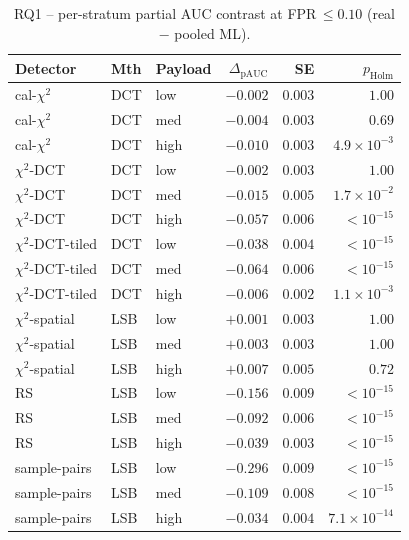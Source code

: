 \documentclass[10pt,twocolumn,a4paper]{article}
\begin{document}
\begin{table}[h]
\centering\footnotesize
\caption{RQ1 -- per-stratum partial AUC contrast at FPR\,$\leq\!0.10$ (real $-$ pooled ML).}
\label{tab:appendix-pauc}
\setlength{\tabcolsep}{4pt}\renewcommand{\arraystretch}{1.1}
\begin{tabular}{@{}l l l r r r@{}}
\toprule
\textbf{Detector} & \textbf{Mth} & \textbf{Payload} & \textbf{$\Delta_\text{pAUC}$} & \textbf{SE} & \textbf{$p_\text{Holm}$} \\
\midrule
cal-$\chi^2$         & DCT & low    & $-0.002$ & $0.003$ & $1.00$ \\
cal-$\chi^2$         & DCT & med    & $-0.004$ & $0.003$ & $0.69$ \\
cal-$\chi^2$         & DCT & high   & $-0.010$ & $0.003$ & $4.9\!\times\!10^{-3}$ \\
$\chi^2$-DCT         & DCT & low    & $-0.002$ & $0.003$ & $1.00$ \\
$\chi^2$-DCT         & DCT & med    & $-0.015$ & $0.005$ & $1.7\!\times\!10^{-2}$ \\
$\chi^2$-DCT         & DCT & high   & $-0.057$ & $0.006$ & $<\!10^{-15}$ \\
$\chi^2$-DCT-tiled   & DCT & low    & $-0.038$ & $0.004$ & $<\!10^{-15}$ \\
$\chi^2$-DCT-tiled   & DCT & med    & $-0.064$ & $0.006$ & $<\!10^{-15}$ \\
$\chi^2$-DCT-tiled   & DCT & high   & $-0.006$ & $0.002$ & $1.1\!\times\!10^{-3}$ \\
$\chi^2$-spatial     & LSB & low    & $+0.001$ & $0.003$ & $1.00$ \\
$\chi^2$-spatial     & LSB & med    & $+0.003$ & $0.003$ & $1.00$ \\
$\chi^2$-spatial     & LSB & high   & $+0.007$ & $0.005$ & $0.72$ \\
RS                   & LSB & low    & $-0.156$ & $0.009$ & $<\!10^{-15}$ \\
RS                   & LSB & med    & $-0.092$ & $0.006$ & $<\!10^{-15}$ \\
RS                   & LSB & high   & $-0.039$ & $0.003$ & $<\!10^{-15}$ \\
sample-pairs         & LSB & low    & $-0.296$ & $0.009$ & $<\!10^{-15}$ \\
sample-pairs         & LSB & med    & $-0.109$ & $0.008$ & $<\!10^{-15}$ \\
sample-pairs         & LSB & high   & $-0.034$ & $0.004$ & $7.1\!\times\!10^{-14}$ \\
\bottomrule
\end{tabular}
\end{table}
\end{document}
